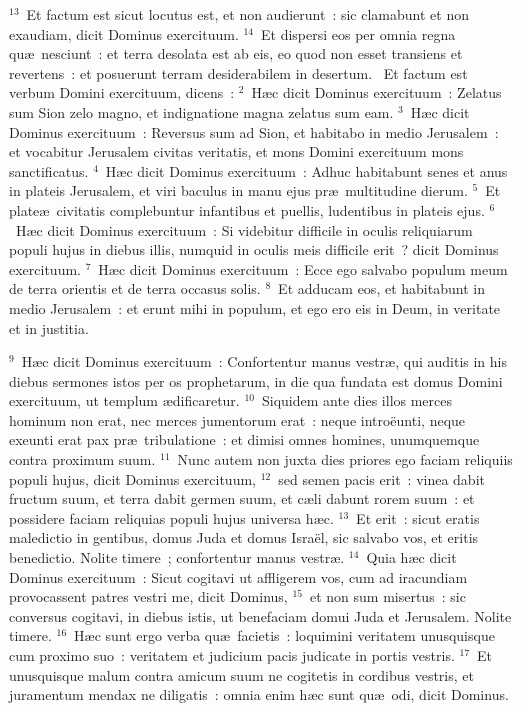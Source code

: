 ${}^{13}$~Et factum est sicut locutus est, et non audierunt~: sic clamabunt et non exaudiam, dicit Dominus exercituum.
${}^{14}$~Et dispersi eos per omnia regna qu\ae\ nesciunt~: et terra desolata est ab eis, eo quod non esset transiens et revertens~: et posuerunt terram desiderabilem in desertum.
~\lettrine[lines=10,image=true,loversize=0.05,lraise=-0.03]{E}{}t factum est verbum Domini exercituum, dicens~:
${}^{2}$~H\ae c dicit Dominus exercituum~: Zelatus sum Sion zelo magno, et indignatione magna zelatus sum eam.
${}^{3}$~H\ae c dicit Dominus exercituum~: Reversus sum ad Sion, et habitabo in medio Jerusalem~: et vocabitur Jerusalem civitas veritatis, et mons Domini exercituum mons sanctificatus.
${}^{4}$~H\ae c dicit Dominus exercituum~: Adhuc habitabunt senes et anus in plateis Jerusalem, et viri baculus in manu ejus pr\ae\ multitudine dierum.
${}^{5}$~Et plate\ae\ civitatis complebuntur infantibus et puellis, ludentibus in plateis ejus.
${}^{6}$~H\ae c dicit Dominus exercituum~: Si videbitur difficile in oculis reliquiarum populi hujus in diebus illis, numquid in oculis meis difficile erit~? dicit Dominus exercituum.
${}^{7}$~H\ae c dicit Dominus exercituum~: Ecce ego salvabo populum meum de terra orientis et de terra occasus solis.
${}^{8}$~Et adducam eos, et habitabunt in medio Jerusalem~: et erunt mihi in populum, et ego ero eis in Deum, in veritate et in justitia.


${}^{9}$~H\ae c dicit Dominus exercituum~: Confortentur manus vestr\ae , qui auditis in his diebus sermones istos per os prophetarum, in die qua fundata est domus Domini exercituum, ut templum \ae dificaretur.
${}^{10}$~Siquidem ante dies illos merces hominum non erat, nec merces jumentorum erat~: neque intro\"eunti, neque exeunti erat pax pr\ae\ tribulatione~: et dimisi omnes homines, unumquemque contra proximum suum.
${}^{11}$~Nunc autem non juxta dies priores ego faciam reliquiis populi hujus, dicit Dominus exercituum,
${}^{12}$~sed semen pacis erit~: vinea dabit fructum suum, et terra dabit germen suum, et c\ae li dabunt rorem suum~: et possidere faciam reliquias populi hujus universa h\ae c.
${}^{13}$~Et erit~: sicut eratis maledictio in gentibus, domus Juda et domus Isra\"el, sic salvabo vos, et eritis benedictio. Nolite timere~; confortentur manus vestr\ae .
${}^{14}$~Quia h\ae c dicit Dominus exercituum~: Sicut cogitavi ut affligerem vos, cum ad iracundiam provocassent patres vestri me, dicit Dominus,
${}^{15}$~et non sum misertus~: sic conversus cogitavi, in diebus istis, ut benefaciam domui Juda et Jerusalem. Nolite timere.
${}^{16}$~H\ae c sunt ergo verba qu\ae\ facietis~: loquimini veritatem unusquisque cum proximo suo~: veritatem et judicium pacis judicate in portis vestris.
${}^{17}$~Et unusquisque malum contra amicum suum ne cogitetis in cordibus vestris, et juramentum mendax ne diligatis~: omnia enim h\ae c sunt qu\ae\ odi, dicit Dominus.


